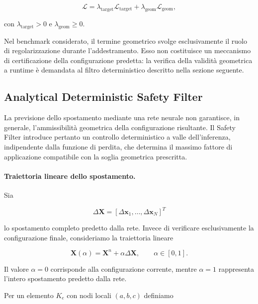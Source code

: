 \begin{equation}
\mathcal{L}
=
\lambda_{\mathrm{target}}
\mathcal{L}_{\mathrm{target}}
+
\lambda_{\mathrm{geom}}
\mathcal{L}_{\mathrm{geom}},
\label{eq:gnn_loss}
\end{equation}

con $\lambda_{\mathrm{target}}>0$ e $\lambda_{\mathrm{geom}}\geq0$.

Nel benchmark considerato, il termine geometrico svolge esclusivamente il ruolo di regolarizzazione durante l'addestramento. Esso non costituisce un meccanismo di certificazione della configurazione predetta: la verifica della validità geometrica a runtime è demandata al filtro deterministico descritto nella sezione seguente.

\subsection{Analytical Deterministic Safety Filter}
\label{subsec:safety_filter}

La previsione dello spostamento mediante una rete neurale non garantisce, in generale, l'ammissibilità geometrica della configurazione risultante. Il Safety Filter introduce pertanto un controllo deterministico a valle dell'inferenza, indipendente dalla funzione di perdita, che determina il massimo fattore di applicazione compatibile con la soglia geometrica prescritta.

\paragraph{Traiettoria lineare dello spostamento.}

Sia

\[
\Delta\mathbf{X}
=
\left[
\Delta\mathbf{x}_1,\ldots,
\Delta\mathbf{x}_N
\right]^T
\]

lo spostamento completo predetto dalla rete. Invece di verificare esclusivamente la configurazione finale, consideriamo la traiettoria lineare

\begin{equation}
\mathbf{X}(\alpha)
=
\mathbf{X}^{n}
+
\alpha\Delta\mathbf{X},
\qquad
\alpha\in[0,1].
\label{eq:linear_mesh_trajectory}
\end{equation}

Il valore $\alpha=0$ corrisponde alla configurazione corrente, mentre $\alpha=1$ rappresenta l'intero spostamento predetto dalla rete.

Per un elemento $K_e$ con nodi locali $(a,b,c)$ definiamo

